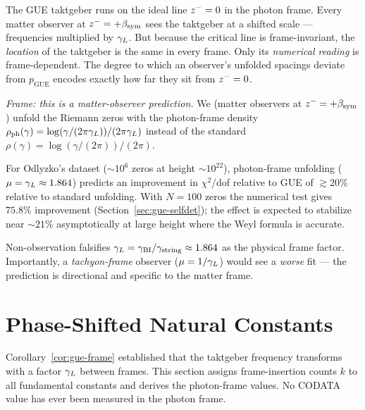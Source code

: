 \begin{remark}
The GUE taktgeber runs on the ideal line $z^-=0$ in the photon frame.
Every matter observer at $z^-=+\beta_{\mathrm{sym}}$ sees the taktgeber at a shifted
scale --- frequencies multiplied by $\gamma_L$.
But because the critical line is frame-invariant, the \emph{location} of
the taktgeber is the same in every frame.
Only its \emph{numerical reading} is frame-dependent.
The degree to which an observer's unfolded spacings deviate from
$p_{\mathrm{GUE}}$ encodes exactly how far they sit from $z^-=0$.
\end{remark}

\begin{corollary}
\label{cor:odlyzko}
\emph{Frame: this is a matter-observer prediction.}
We (matter observers at $z^-=+\beta_{\mathrm{sym}}$) unfold the Riemann zeros
with the photon-frame density $\rho_{\mathrm{ph}}(\gamma) =
\log(\gamma/(2\pi\gamma_L))/(2\pi\gamma_L)$ instead of the standard
$\rho(\gamma) = \log(\gamma/(2\pi))/(2\pi)$.

For Odlyzko's dataset (${\sim}10^6$ zeros at height ${\sim}10^{22}$),
photon-frame unfolding ($\mu=\gamma_L\approx 1.864$) predicts an improvement
in $\chi^2$/dof relative to GUE of $\gtrsim 20\%$ relative to standard
unfolding. With $N=100$ zeros the numerical test gives $75.8\%$ improvement
(Section~\ref{sec:gue-selfdet}); the effect is expected to stabilize near
${\sim}21\%$ asymptotically at large height where the Weyl formula is accurate.

Non-observation falsifies $\gamma_L=\gamma_{\mathrm{BI}}/\gamma_{\mathrm{string}}\approx 1.864$ as the physical
frame factor. Importantly, a \emph{tachyon-frame} observer ($\mu=1/\gamma_L$)
would see a \emph{worse} fit --- the prediction is directional and specific
to the matter frame.
\end{corollary}


\section{Phase-Shifted Natural Constants}
\label{sec:phase-constants}

\begin{remark}
Corollary~\ref{cor:gue-frame} established that the taktgeber frequency
transforms with a factor $\gamma_L$ between frames.
This section assigns frame-insertion counts $k$ to all fundamental
constants and derives the photon-frame values.
No CODATA value has ever been measured in the photon frame.
\end{remark}

